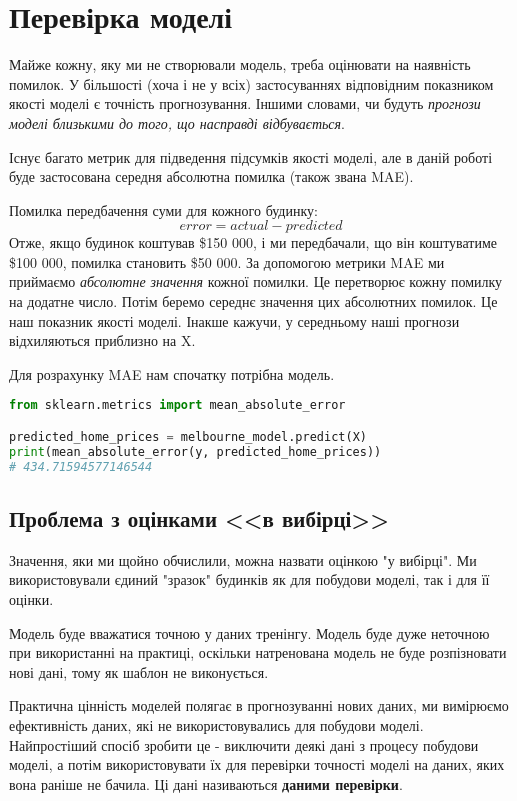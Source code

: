\chapter{Перевірка моделі}\label{cha:model_validation}
Майже кожну, яку ми не створювали модель, треба оцінювати на наявність помилок.
У більшості (хоча і не у всіх) застосуваннях відповідним показником якості моделі є точність прогнозування.
Іншими словами, чи будуть \textit{прогнози моделі близькими до того, що насправді відбувається}.

Існує багато метрик для підведення підсумків якості моделі, але в даній роботі буде застосована середня абсолютна помилка (також звана MAE).

Помилка передбачення суми для кожного будинку:
\[error=actual-predicted\]
Отже, якщо будинок коштував \$150 000, і ми передбачали, що він коштуватиме \$100 000, помилка становить \$50 000.
За допомогою метрики MAE ми приймаємо \textit{абсолютне значення} кожної помилки.
Це перетворює кожну помилку на додатне число.
Потім беремо середнє значення цих абсолютних помилок.
Це наш показник якості моделі.
Інакше кажучи, у середньому наші прогнози відхиляються приблизно на X.

Для розрахунку MAE нам спочатку потрібна модель.

\begin{lstlisting}[style=light, language=Python,label={lst:vectorimg},caption=Розрахунок середньої абсолютної похибки]
from sklearn.metrics import mean_absolute_error

predicted_home_prices = melbourne_model.predict(X)
print(mean_absolute_error(y, predicted_home_prices))
# 434.71594577146544
\end{lstlisting}

\section{Проблема з оцінками <<в вибірці>>}\label{sec:in_sample_problem}
Значення, яки ми щойно обчислили, можна назвати оцінкою "у вибірці".
Ми використовували єдиний "зразок" будинків як для побудови моделі, так і для її оцінки.

Модель буде вважатися точною у даних тренінгу.
Модель буде дуже неточною при використанні на практиці, оскільки натренована модель не буде розпізновати нові дані, тому як шаблон не виконується.

Практична цінність моделей полягає в прогнозуванні нових даних, ми вимірюємо ефективність даних, які не використовувались для побудови моделі.
Найпростіший спосіб зробити це - виключити деякі дані з процесу побудови моделі, а потім використовувати їх для перевірки точності моделі на даних, яких вона раніше не бачила.
Ці дані називаються \textbf{даними перевірки}.


